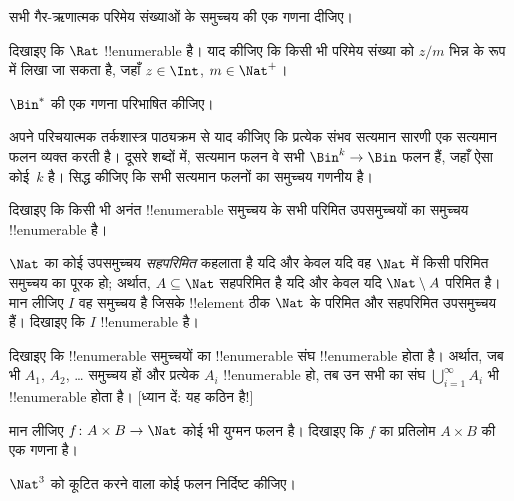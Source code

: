 \documentclass[../../../include/open-logic-section]{subfiles}
\begin{document}
\begin{prob}
सभी गैर-ऋणात्मक परिमेय संख्याओं के समुच्चय की एक गणना दीजिए।
\end{prob}

\begin{prob}
दिखाइए कि $\Rat$ !!{enumerable} है। याद कीजिए कि किसी भी परिमेय संख्या को
$z/m$ भिन्न के रूप में लिखा जा सकता है, जहाँ $z \in \Int$, $m \in \Nat^+$।
\end{prob}

\begin{prob}
$\Bin^*$ की एक गणना परिभाषित कीजिए।
\end{prob}

\begin{prob}
अपने परिचयात्मक तर्कशास्त्र पाठ्यक्रम से याद कीजिए कि प्रत्येक संभव सत्यमान
सारणी एक सत्यमान फलन व्यक्त करती है। दूसरे शब्दों में, सत्यमान फलन वे सभी
$\Bin^k \to \Bin$ फलन हैं, जहाँ ऐसा कोई~$k$ है। सिद्ध कीजिए कि सभी
सत्यमान फलनों का समुच्चय गणनीय है।
\end{prob}

\begin{prob}
दिखाइए कि किसी भी अनंत !!{enumerable} समुच्चय के सभी परिमित उपसमुच्चयों
का समुच्चय !!{enumerable} है।
\end{prob}

\begin{prob}
$\Nat$ का कोई उपसमुच्चय \emph{सहपरिमित} कहलाता है यदि और केवल यदि वह
$\Nat$ में किसी परिमित समुच्चय का पूरक हो; अर्थात, $A \subseteq \Nat$
सहपरिमित है यदि और केवल यदि $\Nat\setminus A$ परिमित है। मान लीजिए $I$ वह
समुच्चय है जिसके !!{element} ठीक $\Nat$ के परिमित और सहपरिमित उपसमुच्चय हैं।
दिखाइए कि $I$ !!{enumerable} है।
\end{prob}

\begin{prob}
दिखाइए कि !!{enumerable} समुच्चयों का !!{enumerable} संघ !!{enumerable}
होता है। अर्थात, जब भी $A_1$, $A_2$, \dots{} समुच्चय हों और प्रत्येक $A_i$
!!{enumerable} हो, तब उन सभी का संघ $\bigcup_{i=1}^\infty
A_i$ भी
!!{enumerable} होता है। [ध्यान दें: यह कठिन है!]
\end{prob}

\begin{prob}
मान लीजिए $f \colon A \times B \to \Nat$ कोई भी युग्मन फलन है।
दिखाइए कि $f$ का प्रतिलोम $A \times B$ की एक गणना है।
\end{prob}

\begin{prob}
$\Nat^3$ को कूटित करने वाला कोई फलन निर्दिष्ट कीजिए।
\end{prob}
\end{document}
